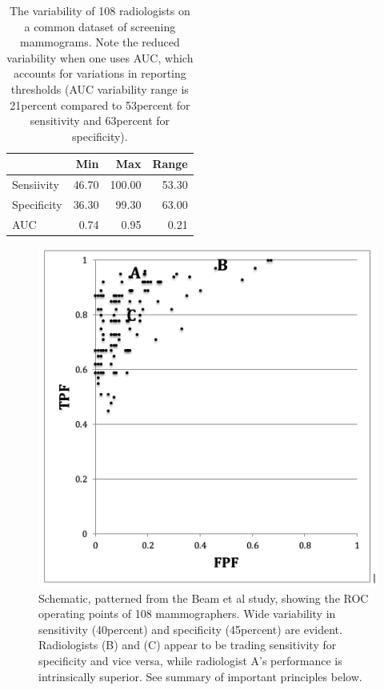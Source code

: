 \documentclass[
]{book}
\begin{document}
\begin{table}

\caption{\label{tab:binary-task-model-table-beam-study}The variability of 108 radiologists on a common dataset of screening mammograms. Note the reduced variability when one uses AUC, which accounts for variations in reporting thresholds (AUC variability range is 21percent compared to 53percent for sensitivity and 63percent for specificity).}
\centering
\begin{tabular}[t]{l|r|r|r}
\hline
  & Min & Max & Range\\
\hline
Sensiivity & 46.70 & 100.00 & 53.30\\
\hline
Specificity & 36.30 & 99.30 & 63.00\\
\hline
AUC & 0.74 & 0.95 & 0.21\\
\hline
\end{tabular}
\end{table}

\begin{figure}
\includegraphics[width=0.8\linewidth]{images/BeamStudy} \caption{Schematic, patterned from the Beam et al study, showing the ROC operating points of 108 mammographers. Wide variability in sensitivity (40percent) and specificity (45percent) are evident. Radiologists (B) and (C) appear to be trading sensitivity for specificity and vice versa, while radiologist A's performance is intrinsically superior. See summary of important principles below.}\label{fig:beam-study-fig}
\end{figure}
\end{document}
